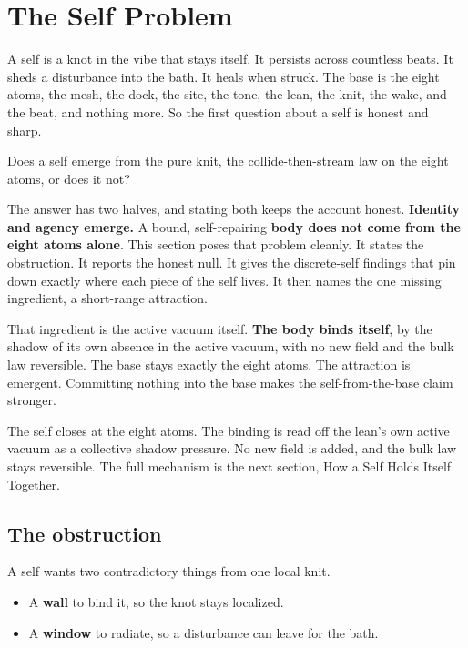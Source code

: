 \section{The Self Problem}

A self is a knot in the vibe that stays itself. It persists across countless beats. It sheds a disturbance into the bath. It heals when struck. The base is the eight atoms, the mesh, the dock, the site, the tone, the lean, the knit, the wake, and the beat, and nothing more. So the first question about a self is honest and sharp.

\begin{principle}
Does a self emerge from the pure knit, the collide-then-stream law on the eight atoms, or does it not?
\end{principle}

The answer has two halves, and stating both keeps the account honest. \textbf{Identity and agency emerge.} A bound, self-repairing \textbf{body does not come from the eight atoms alone}. This section poses that problem cleanly. It states the obstruction. It reports the honest null. It gives the discrete-self findings that pin down exactly where each piece of the self lives. It then names the one missing ingredient, a short-range attraction.

That ingredient is the active vacuum itself. \textbf{The body binds itself}, by the shadow of its own absence in the active vacuum, with no new field and the bulk law reversible. The base stays exactly the eight atoms. The attraction is emergent. Committing nothing into the base makes the self-from-the-base claim stronger.

\begin{result}
The self closes at the eight atoms. The binding is read off the lean's own active vacuum as a collective shadow pressure. No new field is added, and the bulk law stays reversible. The full mechanism is the next section, How a Self Holds Itself Together.
\end{result}

\subsection{The obstruction}

A self wants two contradictory things from one local knit.

\begin{itemize}
\item A \textbf{wall} to bind it, so the knot stays localized.
\item A \textbf{window} to radiate, so a disturbance can leave for the bath.
\end{itemize}

